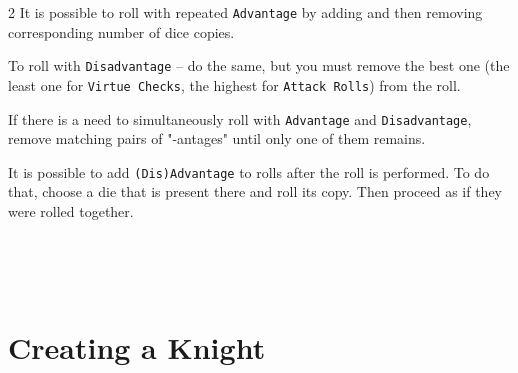 \documentclass{osr-template/zine}
\begin{document}
\begin{multicols*}{2}
It is possible to roll with repeated \texttt{Advantage} by adding and then removing corresponding number of dice copies.

To roll with \texttt{Disadvantage} -- do the same, but you must remove the best one (the least one for \texttt{Virtue Checks}, the highest for \texttt{Attack Rolls}) from the roll.

If there is a need to simultaneously roll with \texttt{Advantage} and \texttt{Disadvantage}, remove matching pairs of "-antages" until only one of them remains.

It is possible to add \texttt{(Dis)Advantage} to rolls after the roll is performed.
To do that, choose a die that is present there and roll its copy.
Then proceed as if they were rolled together.


\end{multicols*}

\newpage

\ %

\newpage

\ %

\newpage
\section*{\centering \fontsize{35}{45}\selectfont Creating a Knight}
\vspace*{0.4 cm}
\end{document}
